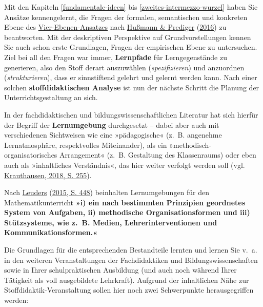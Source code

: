 \documentclass[
  ngerman,
]{scrbook}
\theoremstyle{definition}
\theoremstyle{definition}
\theoremstyle{definition}
\theoremstyle{definition}
\theoremstyle{remark}
\begin{document}
Mit den Kapiteln \ref{fundamentale-ideen} bis \ref{zweites-intermezzo-wurzel} haben Sie Ansätze kennengelernt, die Fragen der \textcolor{formalColor}{formalen}, \textcolor{semanticColor}{semantischen} und \textcolor{concreteColor}{konkreten} Ebene des \protect\hyperlink{tab:fragen-ebenen}{Vier-Ebenen-Ansatzes} nach \protect\hyperlink{ref-Hussmann:2016}{Hußmann \& Prediger} (\protect\hyperlink{ref-Hussmann:2016}{2016}) zu beantworten. Mit der deskriptiven Perspektive auf Grundvorstellungen kennen Sie auch schon erste Grundlagen, Fragen der \textcolor{empiricColor}{empirischen} Ebene zu untersuchen. Ziel bei all den Fragen war immer, \textbf{Lernpfade} für Lerngegenstände zu generieren, also den Stoff derart auszuwählen (\emph{spezifizieren}) und anzuordnen (\emph{strukturieren}), dass er sinnstiftend gelehrt und gelernt werden kann. Nach einer solchen \textbf{stoffdidaktischen Analyse} ist nun der nächste Schritt die Planung der Unterrichtsgestaltung an sich.

In der fachdidaktischen und bildungswissenschaftlichen Literatur hat sich hierfür der Begriff der \textbf{Lernumgebung} durchgesetzt -- dabei aber auch mit verschiedenen Sichtweisen wie eine »pädagogische« (z.~B. angenehme Lernatmosphäre, respektvolles Miteinander), als ein »methodisch-organisatorisches Arrangement« (z.~B. Gestaltung des Klassenraums) oder eben auch als »inhaltliches Verständnis«, das hier weiter verfolgt werden soll (vgl. \protect\hyperlink{ref-Krauthausen:2018}{Krauthausen, 2018, S. 255}).

Nach \protect\hyperlink{ref-Leuders2015}{Leuders} (\protect\hyperlink{ref-Leuders2015}{2015, S. 448}) beinhalten Lernumgebungen für den Mathematikunterricht \textbf{»i) ein nach bestimmten Prinzipien geordnetes System von Aufgaben, ii) methodische Organisationsformen und iii) Stützsysteme, wie z.~B. Medien, Lehrerinterventionen und Kommunikationsformen.«}

Die Grundlagen für die entsprechenden Bestandteile lernten und lernen Sie v.~a. in den weiteren Veranstaltungen der Fachdidaktiken und Bildungswissenschaften sowie in Ihrer schulpraktischen Ausbildung (und auch noch während Ihrer Tätigkeit als voll ausgebildete Lehrkraft). Aufgrund der inhaltlichen Nähe zur Stoffdidaktik-Veranstaltung sollen hier noch zwei Schwerpunkte herausgegriffen werden:
\end{document}
